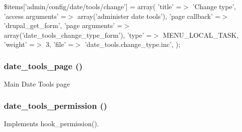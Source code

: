 \$items\mbox{[}'admin/config/date/tools/change'\mbox{]} = array( 'title' =$>$ 'Change type', 'access arguments' =$>$ array('administer date tools'), 'page callback' =$>$ 'drupal\_\-get\_\-form', 'page arguments' =$>$ array('date\_\-tools\_\-change\_\-type\_\-form'), 'type' =$>$ MENU\_\-LOCAL\_\-TASK, 'weight' =$>$ 3, 'file' =$>$ 'date\_\-tools.change\_\-type.inc', );\hypertarget{date__tools_8module_a5207aac2d00ede5fa29257410b3fb68d}{
\subsubsection[{date\_\-tools\_\-page}]{\setlength{\rightskip}{0pt plus 5cm}date\_\-tools\_\-page ()}}
\label{date__tools_8module_a5207aac2d00ede5fa29257410b3fb68d}
Main Date Tools page \hypertarget{date__tools_8module_ac007e8a645addfc1c9b043f085b4cf02}{
\subsubsection[{date\_\-tools\_\-permission}]{\setlength{\rightskip}{0pt plus 5cm}date\_\-tools\_\-permission ()}}
\label{date__tools_8module_ac007e8a645addfc1c9b043f085b4cf02}
Implements hook\_\-permission(). 